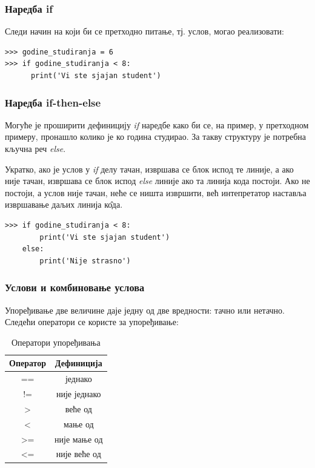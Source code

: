 \subsubsection{Наредба if}

Следи начин на који би се претходно питање, тј. услов, могао реализовати:

\begin{lstlisting}[caption = Пример услова, label = if]
>>> godine_studiranja = 6
>>> if godine_studiranja < 8:
      print('Vi ste sjajan student')
\end{lstlisting}

\subsubsection{Наредба if-then-else}

Могуће је проширити дефиницију \emph{if} наредбе како би се, на пример, у претходном примеру, пронашло колико је ко година студирао. За такву структуру је потребна кључна реч \emph{else}.

Укратко, ако је услов у \emph{if} делу тачан, извршава се блок испод те линије, а ако није тачан, извршава се блок испод \emph{else} линије ако та линија кода постоји. Ако не постоји, а услов није тачан, неће се ништа извршити, већ интепретатор наставља извршавање даљих линија к\^{о}да.

\begin{lstlisting}[caption = Пример за наредбе IF - ELSE, label = ifelse]
>>> if godine_studiranja < 8:
        print('Vi ste sjajan student')
    else:
        print('Nije strasno')
\end{lstlisting}

\subsubsection{Услови и комбиновање услова}

Упоређивање две величине даје једну од две вредности: тачно или нетачно. Следећи оператори се користе за упоређивање:

\begin{table}[here]
\centering
\begin{tabular}{|c|c|} \hline
\textbf{Оператор} & \textbf{Дефиниција} \\ \hline \hline
== & једнако \\ \hline
!= & није једнако \\ \hline
> & веће од  \\ \hline
< & мање од \\ \hline
>= & није мање од \\ \hline
<= & није веће од \\ \hline
\end{tabular}\medskip
\caption{Оператори упоређивања}
\label{tabele:opporedjenja}
\end{table}

